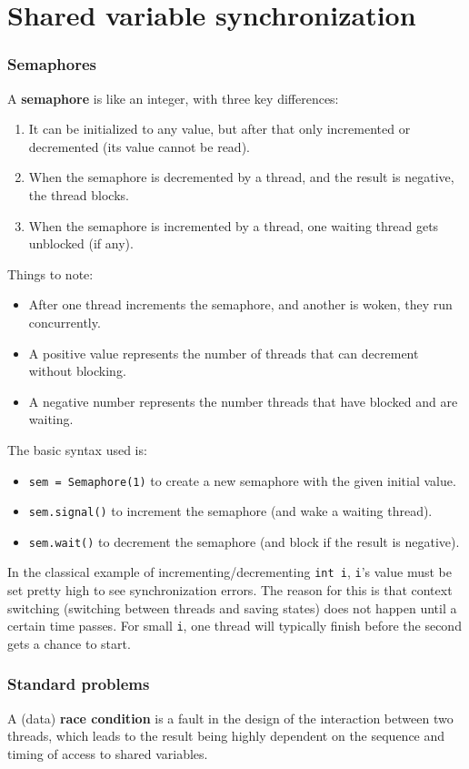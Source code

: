 \part{Shared variable synchronization}
\section{Semaphores}
A \textbf{semaphore} is like an integer, with three key differences:
\begin{enumerate}
    \item It can be initialized to any value, but after that only incremented or decremented (its value cannot be read).
    \item When the semaphore is decremented by a thread, and the result is negative, the thread blocks.
    \item When the semaphore is incremented by a thread, one waiting thread gets unblocked (if any).
\end{enumerate} 
Things to note:
\begin{itemize}
    \item After one thread increments the semaphore, and another is woken, they run concurrently.
    \item A positive value represents the number of threads that can decrement without blocking.
    \item A negative number represents the number threads that have blocked and are waiting.
\end{itemize}
The basic syntax used is:
\begin{itemize}
    \item \texttt{sem = Semaphore(1)} to create a new semaphore with the given initial value.
    \item \texttt{sem.signal()} to increment the semaphore (and wake a waiting thread).
    \item \texttt{sem.wait()} to decrement the semaphore (and block if the result is negative).
\end{itemize}
In the classical example of incrementing/decrementing \texttt{int i}, \texttt{i}'s value must be set pretty high to see synchronization errors. The reason for this is that context switching (switching between threads and saving states) does not happen until a certain time passes. For small \texttt{i}, one thread will typically finish before the second gets a chance to start.

\section{Standard problems}
A (data) \textbf{race condition} is a fault in the design of the interaction between two threads, which leads to the result being highly dependent on the sequence and timing of access to shared variables.

